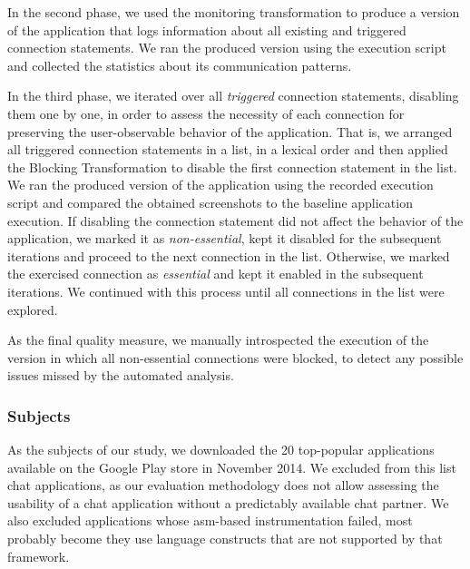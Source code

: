 In the second phase, we used the monitoring transformation to produce a version of the %
application that logs information about all existing and triggered connection statements. We ran the produced version using the execution script and collected the statistics about its communication patterns.  

In the third phase, we iterated over all \emph{triggered} connection statements, disabling them one by one, in order to assess
the necessity of each connection for preserving the user-observable behavior of the application. 
That is, we arranged all triggered connection statements in a list, in a lexical order and then applied the Blocking Transformation to disable the first connection statement in the list.   
We ran the produced version of the application using the recorded execution script and compared the obtained screenshots to the baseline application execution. If disabling the connection statement did not affect the behavior of the application, we marked it as \emph{non-essential}, kept it disabled for the subsequent iterations and proceed to the next connection in the list.
Otherwise, we marked the exercised connection as \emph{essential} and kept it enabled in the subsequent iterations.
We continued with this process until all connections in the list were explored.

As the final quality measure, we manually introspected the execution of the version in which all non-essential connections
were blocked, to detect any  possible issues missed by the automated analysis.

\subsubsection{Subjects}
As the subjects of our study, we downloaded the 20 top-popular applications available on the Google Play store in November 2014. 
We excluded from this list chat applications, as our evaluation methodology does not allow assessing the usability of a chat application without a predictably available chat partner. 
We also excluded applications whose asm-based instrumentation failed, most probably become they use language constructs that are not supported by that framework.

